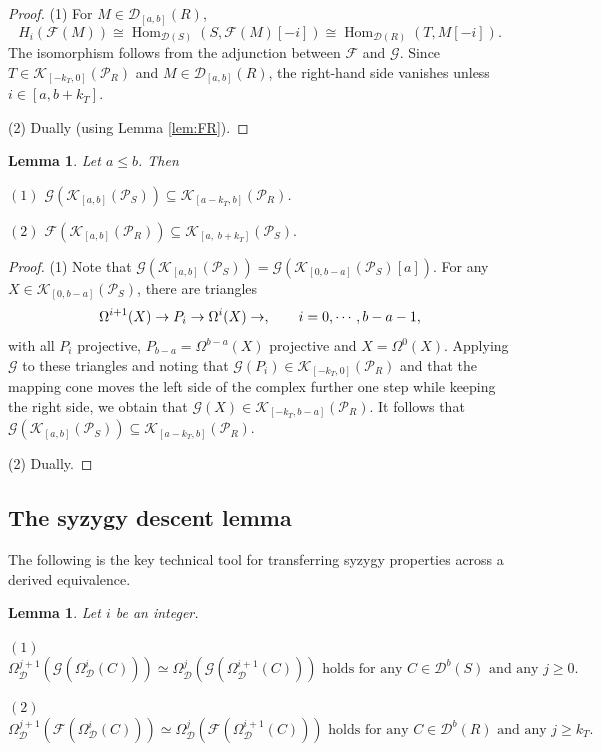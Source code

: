 \documentclass[12pt,a4paper,reqno]{amsart}
\theoremstyle{plain}
\newtheorem{lemma}[theorem]{Lemma}
\theoremstyle{definition}
\theoremstyle{remark}
\DeclareMathOperator{\Hom}{Hom}
\newcommand{\D}{\mathcal{D}}
\newcommand{\Db}{\mathcal{D}^b}
\newcommand{\K}{\mathcal{K}}
\newcommand{\PR}{\mathcal{P}_R}
\newcommand{\PS}{\mathcal{P}_S}
\newcommand{\syz}{\Omega_{\mathcal{D}}}
\begin{document}
\begin{proof}
(1) For $M \in \D_{[a,b]}(R)$,
\[
H_i(\mathcal{F}(M)) \cong \Hom_{\D(S)}(S, \mathcal{F}(M)[-i]) \cong \Hom_{\D(R)}(T, M[-i]).
\]
The isomorphism follows from the adjunction between $\mathcal{F}$ and $\mathcal{G}$. Since $T \in \K_{[-k_T,0]}(\PR)$ and $M \in \D_{[a,b]}(R)$, the right-hand side vanishes unless $i \in [a, b+k_T]$. 

(2) Dually (using Lemma \ref{lem:FR}). 
\end{proof}

\begin{lemma}\label{lem:image-projective}
Let $a \leq b$. Then 

$(1)$ $\mathcal{G}(\K_{[a,b]}(\PS)) \subseteq \K_{[a-k_T,b]}(\PR)$.

$(2)$ $\mathcal F(\K_{[a,b]}(\mathcal P_R)) \subseteq \K_{[a,\; b+k_T]}(\mathcal P_S).$ 
\end{lemma}

\begin{proof} (1)
Note that $\mathcal{G}(\K_{[a,b]}(\PS)) = \mathcal{G}(\K_{[0,b-a]}(\PS)[a])$.  For any $X\in \K_{[0,b-a]}(\PS)$, there are triangles $$\Omega^{i+1}(X)\to P_i\to \Omega^{i}(X) \to, \hskip 20pt i=0,\cdots,b-a-1,$$ with all $P_i$ projective,  $P_{b-a}=\Omega^{b-a}(X)$ projective and $X = \Omega^0(X)$. Applying $\mathcal{G}$ to these triangles and noting that $\mathcal{G}(P_i)\in \K_{[-k_T,0]}(\PR)$ and that the mapping cone moves the left side of the complex further one step while keeping the right side, we obtain that $\mathcal{G}(X)\in \K_{[-k_T,b-a]}(\PR)$. It follows that $\mathcal{G}(\K_{[a,b]}(\PS)) \subseteq \K_{[a-k_T,b]}(\PR)$. 

(2) Dually.
\end{proof}

\subsection{The syzygy descent lemma}

The following is the key technical tool for transferring syzygy properties across a derived equivalence.

\begin{lemma}\label{lem:syzygy-descent}
Let $i$ be an integer.

$(1)$ \(
\syz^{j+1}(\mathcal{G}(\syz^i(C))) \simeq \syz^{j}(\mathcal{G}(\syz^{i+1}(C))) \text{ holds for any } C \in \Db(S) \text{ and any } j\ge 0.
\)

$(2)$ \(
\syz^{j+1}(\mathcal{F}(\syz^i(C))) \simeq \syz^{j}(\mathcal{F}(\syz^{i+1}(C))) \text{ holds for any } C \in \Db(R) \text{ and any } j\ge k_T.
\)
\end{lemma}
\end{document}
